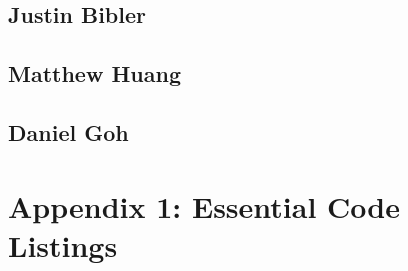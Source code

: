 \documentclass[10pt,journal,compsoc,draftclsnofoot]{IEEEtran}
\begin{document}
\begin{flushleft}
\subsection{Justin Bibler}


\subsection{Matthew Huang}


\subsection{Daniel Goh}



\section{Appendix 1: Essential Code Listings}



\end{flushleft}
\end{document}
